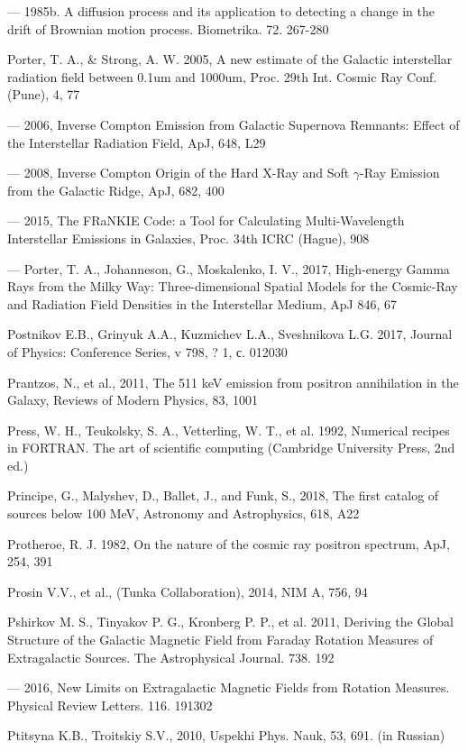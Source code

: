 --- 1985b. A diffusion process and its application to detecting a change in the drift of Brownian motion process. Biometrika. 72. 267-280

Porter, T. A., \& Strong, A. W. 2005, A new estimate of the Galactic interstellar radiation field between 0.1um and 1000um, Proc. 29th Int. Cosmic Ray Conf. (Pune), 4, 77

--- 2006, Inverse Compton Emission from Galactic Supernova Remnants: Effect of the Interstellar Radiation Field, ApJ, 648, L29

--- 2008, Inverse Compton Origin of the Hard X-Ray and Soft $\gamma$-Ray Emission from the Galactic Ridge, ApJ, 682, 400

--- 2015, The FRaNKIE Code: a Tool for Calculating Multi-Wavelength Interstellar Emissions in Galaxies, Proc. 34th ICRC (Hague), 908

--- Porter, T. A., Johanneson, G., Moskalenko, I. V., 2017, High-energy Gamma Rays from the Milky Way: Three-dimensional Spatial Models for the Cosmic-Ray and Radiation Field Densities in the Interstellar Medium, ApJ 846, 67

Postnikov E.B., Grinyuk A.A., Kuzmichev L.A., Sveshnikova L.G. 2017, Journal of Physics: Conference Series, v 798, ? 1, с. 012030

Prantzos, N., et al., 2011, The 511 keV emission from positron annihilation in the Galaxy, Reviews of Modern Physics, 83, 1001

Press, W. H., Teukolsky, S. A., Vetterling, W. T., et al. 1992, Numerical recipes in FORTRAN. The art of scientific computing (Cambridge University Press, 2nd ed.)

Principe, G., Malyshev, D., Ballet, J., and Funk, S., 2018, The first catalog of \fermilat{} sources below 100 MeV, Astronomy and Astrophysics, 618, A22

Protheroe, R. J. 1982, On the nature of the cosmic ray positron spectrum, ApJ, 254, 391 

Prosin V.V., et al., (Tunka Collaboration), 2014, NIM A, 756, 94

Pshirkov M. S., Tinyakov P. G., Kronberg P. P., et al. 2011, Deriving the Global Structure of the Galactic Magnetic Field from Faraday Rotation Measures of Extragalactic Sources. The Astrophysical Journal. 738. 192

--- 2016, New Limits on Extragalactic Magnetic Fields from Rotation Measures. Physical Review Letters. 116. 191302

Ptitsyna K.B., Troitskiy S.V., 2010, Uspekhi Phys. Nauk, 53, 691. (in Russian)


